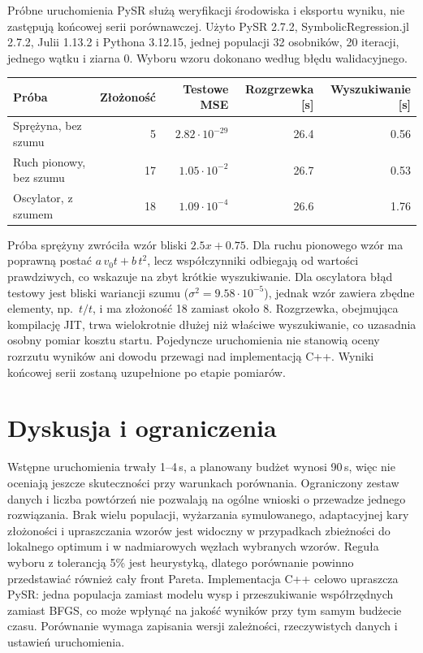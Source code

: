 \documentclass[11pt,a4paper]{article}
\begin{document}
Próbne uruchomienia PySR służą weryfikacji środowiska i eksportu wyniku,
nie zastępują końcowej serii porównawczej. Użyto PySR 2.7.2,
SymbolicRegression.jl 2.7.2, Julii 1.13.2 i Pythona 3.12.15, jednej populacji
32 osobników, 20 iteracji, jednego wątku i ziarna 0. Wyboru wzoru dokonano
według błędu walidacyjnego.
\begin{center}
\begin{tabular}{lrrrr}
\toprule
Próba & Złożoność & Testowe MSE & Rozgrzewka [s] & Wyszukiwanie [s] \\
\midrule
Sprężyna, bez szumu & 5 & $2.82\cdot 10^{-29}$ & 26.4 & 0.56 \\
Ruch pionowy, bez szumu & 17 & $1.05\cdot 10^{-2}$ & 26.7 & 0.53 \\
Oscylator, z szumem & 18 & $1.09\cdot 10^{-4}$ & 26.6 & 1.76 \\
\bottomrule
\end{tabular}
\end{center}
Próba sprężyny zwróciła wzór bliski $2.5x+0.75$. Dla ruchu pionowego
wzór ma poprawną postać $a\,v_0t + b\,t^2$, lecz współczynniki odbiegają od
wartości prawdziwych, co wskazuje na zbyt krótkie wyszukiwanie. Dla oscylatora
błąd testowy jest bliski wariancji szumu ($\sigma^2 = 9.58\cdot 10^{-5}$),
jednak wzór zawiera zbędne elementy, np.\ $t/t$, i ma złożoność 18 zamiast
około 8. Rozgrzewka, obejmująca kompilację JIT, trwa wielokrotnie dłużej niż
właściwe wyszukiwanie, co uzasadnia osobny pomiar kosztu startu. Pojedyncze
uruchomienia nie stanowią oceny rozrzutu wyników ani dowodu przewagi nad
implementacją C++. Wyniki końcowej serii zostaną uzupełnione po etapie
pomiarów.

\section{Dyskusja i ograniczenia}
Wstępne uruchomienia trwały 1--4\,s, a planowany budżet wynosi 90\,s, więc
nie oceniają jeszcze skuteczności przy warunkach porównania. Ograniczony zestaw
danych i liczba powtórzeń nie pozwalają na ogólne wnioski o przewadze jednego
rozwiązania. Brak wielu populacji, wyżarzania symulowanego, adaptacyjnej kary
złożoności i upraszczania wzorów jest widoczny w przypadkach zbieżności do
lokalnego optimum i w nadmiarowych węzłach wybranych wzorów. Reguła wyboru
z tolerancją 5\% jest heurystyką, dlatego porównanie powinno przedstawiać
również cały front Pareta. Implementacja C++ celowo
upraszcza PySR: jedna populacja zamiast modelu wysp i przeszukiwanie
współrzędnych zamiast BFGS, co może wpłynąć na jakość wyników przy tym samym
budżecie czasu. Porównanie wymaga zapisania wersji zależności, rzeczywistych
danych i ustawień uruchomienia.
\end{document}

